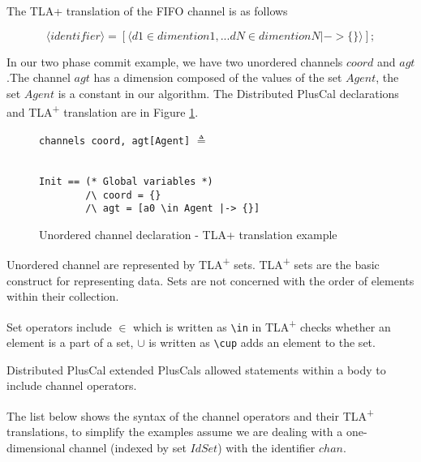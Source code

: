 \documentclass{thesul}
\newcommand{\tlaplus}{TLA\textsuperscript{+}\xspace}
\newcommand{\entity}[1]{\ensuremath{\langle}#1\ensuremath{\rangle}}
\begin{document}
The TLA+ translation of the FIFO channel is as follows

\[
 \entity{identifier} = [\entity{d1 \in dimention1,... dN \in dimentionN |-> \{ \}}];
\]

In our two phase commit example, we have two unordered channels $coord$ and $agt$.The channel $agt$ has a dimension composed of the values of the set $Agent$, the set $Agent$ is a constant in our algorithm. The Distributed PlusCal declarations and \tlaplus translation are in Figure \ref{2pcchannels}.


\FloatBarrier
\begin{figure}[!h]

\begin{minipage}{.3\textwidth}

\lstinline|channels coord, agt[Agent]| $\triangleq$ \\\\
\end{minipage}\hfill
\begin{minipage}{.7\textwidth}
\begin{lstlisting}[frame = none, numbers = none]
Init == (* Global variables *)
        /\ coord = {}
        /\ agt = [a0 \in Agent |-> {}]
\end{lstlisting}

\end{minipage}\hfill

\caption{Unordered channel declaration - TLA+ translation example}
\label{2pcchannels}
\end{figure}
\FloatBarrier

Unordered channel are represented by \tlaplus sets. \tlaplus sets are the basic construct for representing data. Sets are not concerned with the order of elements within their collection.

Set operators include $\in$ which is written as \lstinline|\in| in \tlaplus checks whether an element is a part of a set, $\cup$ is written as \lstinline|\cup| adds an element to the set.

Distributed PlusCal extended PlusCals allowed statements within a body to include channel operators.

The list below shows the syntax of the channel operators and their \tlaplus translations, to simplify the examples assume we are dealing with a one-dimensional channel (indexed by set $IdSet$) with the identifier $chan$.
\end{document}
